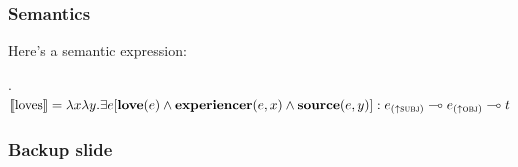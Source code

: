 \documentclass[
11pt,
aspectratio=169, %
]{beamer}
\begin{document}
\begin{frame}
  \frametitle{Semantics}
  Here's a semantic expression:

  \ex.
  $\denotes{loves} = \lambda x \lambda y. \exists e[\prd{love}(e) \land \prd{experiencer}(e,x) \land \prd{source}(e,y)] : e_{\up{subj}} \li e_{\up{obj}} \li t$

\end{frame}





\appendix

\begin{frame}
  \frametitle{Backup slide}

\end{frame}
\end{document}
